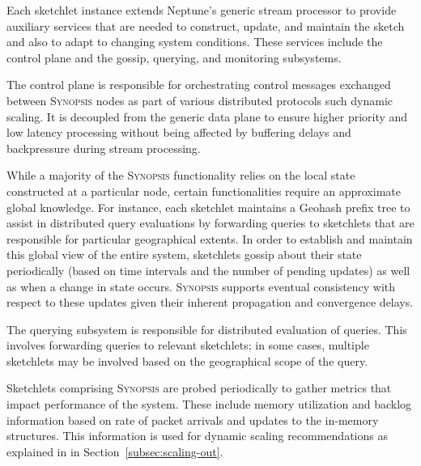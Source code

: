 Each sketchlet instance extends Neptune's generic stream processor to provide auxiliary services that are needed to construct, update, and maintain the sketch and also to adapt to changing system conditions.
These services include the control plane and the gossip, querying, and monitoring subsystems.

\begin{description}[leftmargin=*]
	\item[Control plane:] The control plane is responsible for orchestrating control messages exchanged between \textsc{Synopsis} nodes as part of various distributed protocols such dynamic scaling.
    It is decoupled from the generic data plane to ensure higher priority and low latency processing without being affected by buffering delays and backpressure during stream processing.

	\item[Gossip subsystem:] While a majority of the \textsc{Synopsis} functionality relies on the local state constructed at a particular node, certain functionalities require an approximate global knowledge.
    For instance, each sketchlet maintains a Geohash prefix tree to assist in distributed query evaluations by forwarding queries to sketchlets that are responsible for particular geographical extents.
        In order to establish and maintain this global view of the entire system, sketchlets gossip about their state periodically (based on time intervals and the number of pending updates) as well as when a change in state occurs.
    \textsc{Synopsis} supports eventual consistency with respect to these updates given their inherent propagation and convergence delays.

	\item[Querying subsystem:] The querying subsystem is responsible for distributed evaluation of queries.
    This involves forwarding queries to relevant sketchlets; in some cases, multiple sketchlets may be involved based on the geographical scope of the query.

    \item[Monitoring subsystem:] Sketchlets comprising \textsc{Synopsis} are probed periodically to gather metrics that impact performance of the system.
    These include memory utilization and backlog information based on rate of packet arrivals and updates to the in-memory structures.
    This information is used for dynamic scaling recommendations as explained in in Section~\ref{subsec:scaling-out}.
\end{description}
